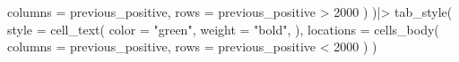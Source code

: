 \documentclass[
]{article}
\newenvironment{Shaded}{\begin{snugshade}}{\end{snugshade}}
\newcommand{\AttributeTok}[1]{\textcolor[rgb]{0.77,0.63,0.00}{#1}}
\newcommand{\DecValTok}[1]{\textcolor[rgb]{0.00,0.00,0.81}{#1}}
\newcommand{\FunctionTok}[1]{\textcolor[rgb]{0.00,0.00,0.00}{#1}}
\newcommand{\NormalTok}[1]{#1}
\newcommand{\SpecialCharTok}[1]{\textcolor[rgb]{0.00,0.00,0.00}{#1}}
\newcommand{\StringTok}[1]{\textcolor[rgb]{0.31,0.60,0.02}{#1}}
\begin{document}
\begin{Shaded}
\begin{Highlighting}[]
      \AttributeTok{columns =}\NormalTok{ previous\_positive,}
      \AttributeTok{rows =}\NormalTok{ previous\_positive }\SpecialCharTok{\textgreater{}} \DecValTok{2000}
\NormalTok{    )}
\NormalTok{  )}\SpecialCharTok{|\textgreater{}} 
  \FunctionTok{tab\_style}\NormalTok{(}
    \AttributeTok{style =} \FunctionTok{cell\_text}\NormalTok{(}
      \AttributeTok{color =} \StringTok{"green"}\NormalTok{,}
      \AttributeTok{weight =} \StringTok{"bold"}\NormalTok{,}
\NormalTok{    ),}
    \AttributeTok{locations =} \FunctionTok{cells\_body}\NormalTok{(}
      \AttributeTok{columns =}\NormalTok{ previous\_positive,}
      \AttributeTok{rows =}\NormalTok{ previous\_positive }\SpecialCharTok{\textless{}} \DecValTok{2000}
\NormalTok{    )}
\NormalTok{  )}
\end{Highlighting}
\end{Shaded}
\end{document}
